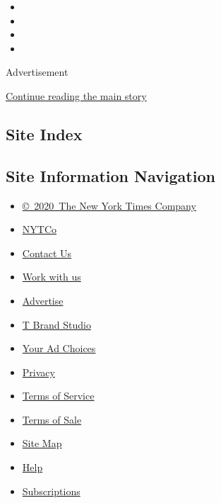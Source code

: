 \begin{itemize}
\item
\item
\item
\item
\end{itemize}

Advertisement

\protect\hyperlink{after-bottom}{Continue reading the main story}

\hypertarget{site-index}{%
\subsection{Site Index}\label{site-index}}

\hypertarget{site-information-navigation}{%
\subsection{Site Information
Navigation}\label{site-information-navigation}}

\begin{itemize}
\tightlist
\item
  \href{https://help.nytimes3xbfgragh.onion/hc/en-us/articles/115014792127-Copyright-notice}{©~2020~The
  New York Times Company}
\end{itemize}

\begin{itemize}
\tightlist
\item
  \href{https://www.nytco.com/}{NYTCo}
\item
  \href{https://help.nytimes3xbfgragh.onion/hc/en-us/articles/115015385887-Contact-Us}{Contact
  Us}
\item
  \href{https://www.nytco.com/careers/}{Work with us}
\item
  \href{https://nytmediakit.com/}{Advertise}
\item
  \href{http://www.tbrandstudio.com/}{T Brand Studio}
\item
  \href{https://www.nytimes3xbfgragh.onion/privacy/cookie-policy\#how-do-i-manage-trackers}{Your
  Ad Choices}
\item
  \href{https://www.nytimes3xbfgragh.onion/privacy}{Privacy}
\item
  \href{https://help.nytimes3xbfgragh.onion/hc/en-us/articles/115014893428-Terms-of-service}{Terms
  of Service}
\item
  \href{https://help.nytimes3xbfgragh.onion/hc/en-us/articles/115014893968-Terms-of-sale}{Terms
  of Sale}
\item
  \href{https://spiderbites.nytimes3xbfgragh.onion}{Site Map}
\item
  \href{https://help.nytimes3xbfgragh.onion/hc/en-us}{Help}
\item
  \href{https://www.nytimes3xbfgragh.onion/subscription?campaignId=37WXW}{Subscriptions}
\end{itemize}
